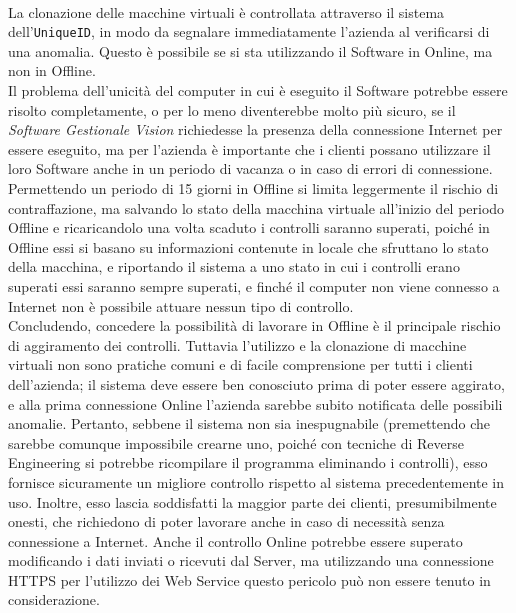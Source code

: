 \\
La clonazione delle macchine virtuali è controllata attraverso il sistema dell'\texttt{UniqueID}, in modo da segnalare immediatamente l'azienda al verificarsi di una anomalia. Questo è possibile se si sta utilizzando il Software in Online, ma non in Offline.
\\
Il problema dell'unicità del computer in cui è eseguito il Software potrebbe essere risolto completamente, o per lo meno diventerebbe molto più sicuro, se il \textit{Software Gestionale Vision} richiedesse la presenza della connessione Internet per essere eseguito, ma per l'azienda è importante che i clienti possano utilizzare il loro Software anche in un periodo di vacanza o in caso di errori di connessione. Permettendo un periodo di 15 giorni in Offline si limita leggermente il rischio di contraffazione, ma salvando lo stato della macchina virtuale all'inizio del periodo Offline e ricaricandolo una volta scaduto i controlli saranno superati, poiché in Offline essi si basano su informazioni contenute in locale che sfruttano lo stato della macchina, e riportando il sistema a uno stato in cui i controlli erano superati essi saranno sempre superati, e finché il computer non viene connesso a Internet non è possibile attuare nessun tipo di controllo.
\\Concludendo, concedere la possibilità di lavorare in Offline è il principale rischio di aggiramento dei controlli. Tuttavia l'utilizzo e la clonazione di macchine virtuali non sono pratiche comuni e di facile comprensione per tutti i clienti dell'azienda; il sistema deve essere ben conosciuto prima di poter essere aggirato, e alla prima connessione Online l'azienda sarebbe subito notificata delle possibili anomalie. Pertanto, sebbene il sistema non sia inespugnabile (premettendo che sarebbe comunque impossibile crearne uno, poiché con tecniche di \gls{Reverse Engineering} si potrebbe ricompilare il programma eliminando i controlli), esso fornisce sicuramente un migliore controllo rispetto al sistema precedentemente in uso. Inoltre, esso lascia soddisfatti la maggior parte dei clienti, presumibilmente onesti, che richiedono di poter lavorare anche in caso di necessità senza connessione a Internet. Anche il controllo Online potrebbe essere superato modificando i dati inviati o ricevuti dal Server, ma utilizzando una connessione HTTPS per l'utilizzo dei Web Service questo pericolo può non essere tenuto in considerazione.